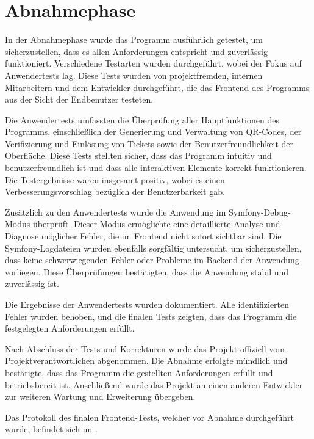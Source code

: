 \section{Abnahmephase} 
\label{sec:Abnahmephase}

In der Abnahmephase wurde das Programm ausführlich getestet, um sicherzustellen, dass es allen Anforderungen entspricht und zuverlässig funktioniert. Verschiedene Testarten wurden durchgeführt, wobei der Fokus auf Anwendertests lag. Diese Tests wurden von projektfremden, internen Mitarbeitern und dem Entwickler durchgeführt, die das Frontend des Programms aus der Sicht der Endbenutzer testeten. 

Die Anwendertests umfassten die Überprüfung aller Hauptfunktionen des Programms, einschließlich der Generierung und Verwaltung von QR-Codes, der Verifizierung und Einlösung von Tickets sowie der Benutzerfreundlichkeit der Oberfläche. Diese Tests stellten sicher, dass das Programm intuitiv und benutzerfreundlich ist und dass alle interaktiven Elemente korrekt funktionieren. Die Testergebnisse waren insgesamt positiv, wobei es einen Verbesserungsvorschlag bezüglich der Benutzerbarkeit gab.

Zusätzlich zu den Anwendertests wurde die Anwendung im Symfony-Debug-Modus überprüft. Dieser Modus ermöglichte eine detaillierte Analyse und Diagnose möglicher Fehler, die im Frontend nicht sofort sichtbar sind. Die Symfony-Logdateien wurden ebenfalls sorgfältig untersucht, um sicherzustellen, dass keine schwerwiegenden Fehler oder Probleme im Backend der Anwendung vorliegen. Diese Überprüfungen bestätigten, dass die Anwendung stabil und zuverlässig ist.

Die Ergebnisse der Anwendertests wurden dokumentiert. Alle identifizierten Fehler wurden behoben, und die finalen Tests zeigten, dass das Programm die festgelegten Anforderungen erfüllt.

Nach Abschluss der Tests und Korrekturen wurde das Projekt offiziell vom Projektverantwortlichen abgenommen. Die Abnahme erfolgte mündlich und bestätigte, dass das Programm die gestellten Anforderungen erfüllt und betriebsbereit ist. Anschließend wurde das Projekt an einen anderen Entwickler zur weiteren Wartung und Erweiterung übergeben.

Das Protokoll des finalen Frontend-Tests, welcher vor Abnahme durchgeführt wurde, befindet sich im .
